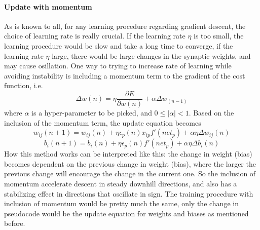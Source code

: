 \documentclass[conference]{IEEEtran}
\begin{document}
\paragraph{Update with momentum}
As is known to all, for any learning procedure regarding gradient descent, the choice of learning rate is really crucial. If the learning rate $\eta$ is too small, the learning procedure would be slow and take a long time to converge, if the learning rate $\eta$ large, there would be large changes in the synaptic weights, and may cause osillation. One way to trying to increase rate of learning while avoiding instability is including a momentum term to the gradient of the cost function, i.e.
$$\Delta w(n) = \eta\displaystyle\frac{\partial E}{\partial w(n)} + \alpha \Delta w_{(n-1)}$$
where $\alpha$ is a hyper-parameter to be picked, and $0\leq |\alpha| <1$. Based on the inclusion of the momentum term, the update equation becomes 
$$w_{ij}(n+1) = w_{ij}(n) + \eta \epsilon_p(n)x_{ip}f'(net_p)+\alpha \eta  \Delta w_{ij}{(n)}$$
$$b_i(n+1) = b_i(n) + \eta \epsilon_p(n)f'(net_p)+\alpha \eta  \Delta b_i{(n)}$$
How this method works can be interpreted like this: the change in weight (bias) becomes dependent on the previous change in weight (bias), where the larger the previous change will encourage the change in the current one. So the inclusion of momentum accelerate descent in steady downhill directions, and also has a stabilizing effect in directions that oscillate in sign. The training procedure with inclusion of momentum would be pretty much the same, only the change in pseudocode would be the update equation for weights and biases as mentioned before.
\end{document}
